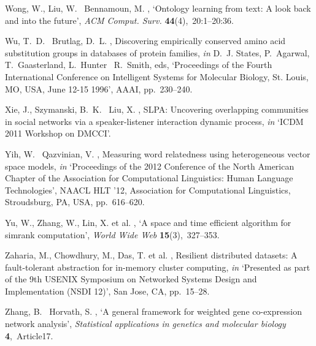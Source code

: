 \documentclass{kais}
\begin{document}
\begin{thebibliography}{xx}
Wong, W., Liu, W. \harvardand\ Bennamoun, M.  \harvardyearright , `Ontology learning from text: A look back and into
  the future', {\em ACM Comput. Surv.} {\bf 44}(4),~20:1--20:36.

Wu, T.~D. \harvardand\ Brutlag, D.~L.  \harvardyearright ,
  Discovering empirically conserved amino acid substitution groups in databases
  of protein families, {\em in} D.~J. States, P.~Agarwal, T.~Gaasterland,
  L.~Hunter \harvardand\ R.~Smith, eds, `Proceedings of the Fourth
  International Conference on Intelligent Systems for Molecular Biology, St.
  Louis, MO, USA, June 12-15 1996', {AAAI}, pp.~230--240.

Xie, J., Szymanski, B.~K. \harvardand\ Liu, X.  \harvardyearleft
  2011\harvardyearright , {SLPA}: Uncovering overlapping communities in social
  networks via a speaker-listener interaction dynamic process, {\em in} `ICDM
  2011 Workshop on DMCCI'.

Yih, W. \harvardand\ Qazvinian, V.  \harvardyearright ,
  Measuring word relatedness using heterogeneous vector space models, {\em in}
  `Proceedings of the 2012 Conference of the North American Chapter of the
  Association for Computational Linguistics: Human Language Technologies',
  NAACL HLT '12, Association for Computational Linguistics, Stroudsburg, PA,
  USA, pp.~616--620.

Yu, W., Zhang, W., Lin, X. et al.  \harvardyearleft
  2012\harvardyearright , `A space and time efficient algorithm for simrank
  computation', {\em World Wide Web} {\bf 15}(3),~327--353.

Zaharia, M., Chowdhury, M., Das, T. et al. \harvardyearleft
  2012\harvardyearright , Resilient distributed datasets: A fault-tolerant
  abstraction for in-memory cluster computing, {\em in} `Presented as part of
  the 9th USENIX Symposium on Networked Systems Design and Implementation (NSDI
  12)', San Jose, CA, pp.~15--28.

Zhang, B. \harvardand\ Horvath, S.  \harvardyearright , `A
  general framework for weighted gene co-expression network analysis', {\em
  Statistical applications in genetics and molecular biology} {\bf
  4},~Article17.

\end{thebibliography}
\end{document}
